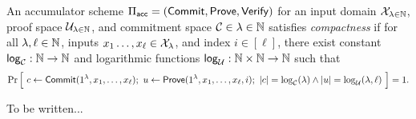 \begin{definition}[Compactness]
    An accumulator scheme $\Pi_{\mathsf{acc}} = (\mathsf{Commit}, \mathsf{Prove}, \mathsf{Verify})$ for an input
    domain $\mathcal{X}_{\lambda \in \mathbb{N}}$, proof space $\mathcal{U}_{\lambda \in \mathbb{N}}$, and
    commitment space $\mathcal{C} \in {\lambda \in \mathbb{N}}$ satisfies \emph{compactness}
    if for all $\lambda, \ell \in \mathbb{N}$, inputs $x_1 \ldots, x_\ell \in
    \mathcal{X}_\lambda$, and index $i \in [\ell]$, there exist constant ${\mathsf{log}}_{\mathcal{C}}:
    \mathbb{N} \to \mathbb{N}$ and logarithmic functions ${\mathsf{log}}_{\mathcal{U}}: \mathbb{N} \times \mathbb{N} \to \mathbb{N}$
    such that
    \[ \Pr \Big[~ c \gets \mathsf{Commit}(1^\lambda, x_1, \ldots, x_\ell) ;~ u \gets
        \mathsf{Prove}(1^\lambda, x_1, \ldots, x_\ell, i) ;~ |c| = \log_{\mathcal{C}}(\lambda) \land |u|
        = \log_{\mathcal{U}}(\lambda, \ell) ~\Big] = 1 .\]
\end{definition}

\begin{definition}[Soundness]
    To be written...
\end{definition}

